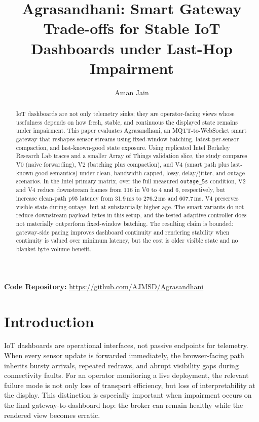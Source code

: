 \documentclass[sigconf,authorversion,nonacm]{acmart}
\begin{document}
\title{Agrasandhani: Smart Gateway Trade-offs for Stable IoT Dashboards under Last-Hop Impairment}

\author{Aman Jain}

\begin{abstract}
IoT dashboards are not only telemetry sinks; they are operator-facing views whose usefulness depends on how fresh, stable, and continuous the displayed state remains under impairment. This paper evaluates Agrasandhani, an MQTT-to-WebSocket smart gateway that reshapes sensor streams using fixed-window batching, latest-per-sensor compaction, and last-known-good state exposure. Using replicated Intel Berkeley Research Lab traces and a smaller Array of Things validation slice, the study compares V0 (naive forwarding), V2 (batching plus compaction), and V4 (smart path plus last-known-good semantics) under clean, bandwidth-capped, lossy, delay/jitter, and outage scenarios. In the Intel primary matrix, over the full measured \texttt{outage\_5s} condition, V2 and V4 reduce downstream frames from 116 in V0 to 4 and 6, respectively, but increase clean-path p95 latency from 31.9\,ms to 276.2\,ms and 607.7\,ms. V4 preserves visible state during outage, but at substantially higher age. The smart variants do not reduce downstream payload bytes in this setup, and the tested adaptive controller does not materially outperform fixed-window batching. The resulting claim is bounded: gateway-side pacing improves dashboard continuity and rendering stability when continuity is valued over minimum latency, but the cost is older visible state and no blanket byte-volume benefit.
\end{abstract}

\maketitle

{\small\noindent\textbf{Code Repository:} \url{https://github.com/AJMSD/Agrasandhani}\par}

\section{Introduction}

IoT dashboards are operational interfaces, not passive endpoints for telemetry. When every sensor update is forwarded immediately, the browser-facing path inherits bursty arrivals, repeated redraws, and abrupt visibility gaps during connectivity faults. For an operator monitoring a live deployment, the relevant failure mode is not only loss of transport efficiency, but loss of interpretability at the display. This distinction is especially important when impairment occurs on the final gateway-to-dashboard hop: the broker can remain healthy while the rendered view becomes erratic.
\end{document}
